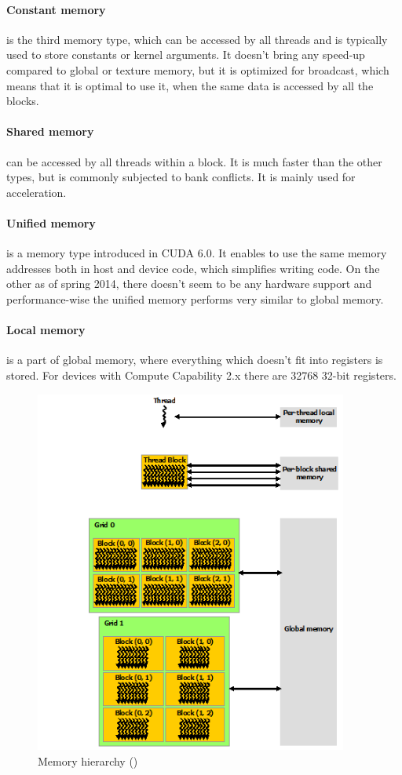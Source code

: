 \paragraph{Constant memory} is the third memory type, which can be accessed by all threads and is typically used to store constants or kernel arguments. It doesn't bring any speed-up compared to global or texture memory, but it is optimized for broadcast, which means that it is optimal to use it, when the same data is accessed by all the blocks.

\paragraph{Shared memory} can be accessed by all threads within a block. It is much faster than the other types, but is commonly subjected to bank conflicts. It is mainly used for acceleration.

\paragraph{Unified memory} is a memory type introduced in CUDA 6.0. It enables to use the same memory addresses both in host and device code, which simplifies writing code. On the other as of spring 2014, there doesn't seem to be any hardware support \cite{unified-memory} and performance-wise the unified memory performs very similar to global memory.

\paragraph{Local memory} is a part of global memory, where everything which doesn't fit into registers is stored. For devices with Compute Capability 2.x there are 32768 32-bit registers.

\begin{center}
\begin{figure}[h]
	\centering\includegraphics[height=12cm]{fig/memory-hierarchy.png}
	\caption{Memory hierarchy (\cite{cuda-toolkit-docs})}
\end{figure}
\end{center}

